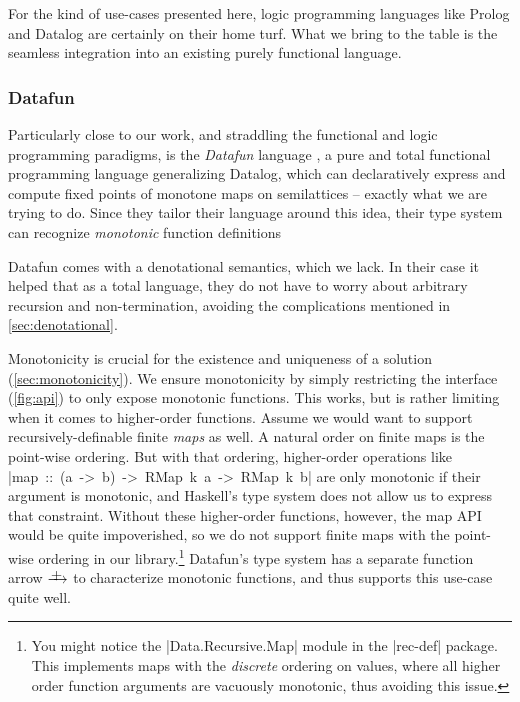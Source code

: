 \documentclass[manuscript,screen,acmsmall,nonacm]{acmart}
\begin{document}
For the kind of use-cases presented here, logic programming languages like Prolog and Datalog are certainly on their home turf. What we bring to the table is the seamless integration into an existing purely functional language.

\subsubsection{Datafun}

Particularly close to our work, and straddling the functional and logic programming paradigms, is the \emph{Datafun} language \citep{datafun}, a pure and total functional programming language generalizing Datalog, which can declaratively express and compute fixed points of monotone maps on semilattices -- exactly what we are trying to do. Since they tailor their language around this idea, their type system can recognize \emph{monotonic} function definitions

Datafun comes with a denotational semantics, which we lack. In their case it helped that as a total language, they do not have to worry about arbitrary recursion and non-termination, avoiding the complications mentioned in \cref{sec:denotational}.

\newcommand{\mfun}{\xrightarrow{\raisebox{-3pt}[0pt][0pt]{+}}}

Monotonicity is crucial for the existence and uniqueness of a solution (\cref{sec:monotonicity}). We ensure monotonicity by simply restricting the interface (\cref{fig:api}) to only expose monotonic functions. This works, but is rather limiting when it comes to higher-order functions. Assume we would want to support recursively-definable finite \emph{maps} as well. A natural order on finite maps is the point-wise ordering. But with that ordering, higher-order operations like \mbox{|map :: (a -> b) -> RMap k a -> RMap k b|} are only monotonic if their argument is monotonic, and Haskell's type system does not allow us to express that constraint. Without these higher-order functions, however, the map API would be quite impoverished, so we do not support finite maps with the point-wise ordering in our library.\footnote{You might notice the |Data.Recursive.Map| module in the |rec-def| package. This implements maps with the \emph{discrete} ordering on values, where all higher order function arguments are vacuously monotonic, thus avoiding this issue.} Datafun's type system has a separate function arrow $\mfun$ to characterize monotonic functions, and thus supports this use-case quite well.
\end{document}
